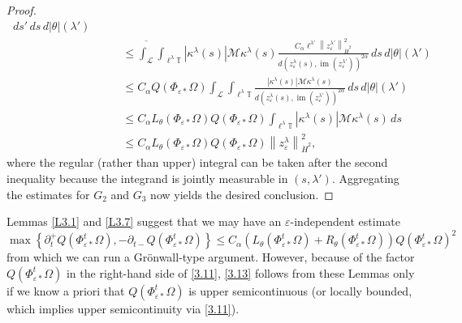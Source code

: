 \documentclass[reqno,centertags,12pt]{amsart}
\theoremstyle{definition}
\numberwithin{equation}{section}
\newcommand{\abs}[1]{\left\lvert#1\right\rvert}
\newcommand{\norm}[1]{\left\|#1\right\|}
\newcommand{\set}[1]{\left\{ #1 \right\}}
\newcommand{\bbT}{{\mathbb{T}}}
\newcommand{\eps}{\varepsilon}
\newcommand{\tht}{\theta}
\begin{document}
\begin{proof}
\begin{align*}
        \,ds'\,ds\,d|\theta|(\lambda')
        \\&\quad\quad \leq
        \overline{\int_{\mathcal{L}}}
        \int_{\ell^{\lambda}\bbT}\abs{\kappa^{\lambda}(s)}\mathcal{M}\kappa^{\lambda}(s)
        \frac{C_{\alpha}\ell^{\lambda'}\norm{z_{\eps}^{\lambda'}}_{\dot{H}^{2}}^{2}}
        {d(z_{\eps}^{\lambda}(s), \operatorname{im}(z_{\eps}^{\lambda'}))^{2\alpha}}
        \,ds\,d|\theta|(\lambda')
        \\&\quad\quad \leq
        C_{\alpha}Q(\Phi_{\eps*}\Omega)
        \int_{\mathcal{L}}
        \int_{\ell^{\lambda}\bbT}
        \frac{\abs{\kappa^{\lambda}(s)}\mathcal{M}\kappa^{\lambda}(s)}
        {d(z_{\eps}^{\lambda}(s), \operatorname{im}(z_{\eps}^{\lambda'}))^{2\alpha}}
        \,ds\,d|\theta|(\lambda')
        \\&\quad\quad \leq
        C_{\alpha}L_{\tht}(\Phi_{\eps*}\Omega)Q(\Phi_{\eps*}\Omega)
        \int_{\ell^{\lambda}\bbT}
        \abs{\kappa^{\lambda}(s)}\mathcal{M}\kappa^{\lambda}(s)\,ds
        \\&\quad\quad \leq C_{\alpha}L_{\tht}(\Phi_{\eps*}\Omega)Q(\Phi_{\eps*}\Omega)
        \norm{z_{\eps}^{\lambda}}_{\dot{H}^{2}}^{2},
    \end{align*}
    where  the regular (rather than upper) integral can be taken after the second inequality  because
    the integrand is jointly measurable in $(s,\lambda')$.
    Aggregating the estimates for $G_{2}$ and $G_{3}$ now yields the desired conclusion.
\end{proof}

Lemmas \ref{L3.1} and \ref{L3.7} suggest that we may have an $\eps$-independent estimate
\begin{equation}\label{3.13}
    \max\set{\partial_{t}^{+}Q(\Phi_{\eps*}^{t}\Omega),
    -\partial_{t-}Q(\Phi_{\eps*}^{t}\Omega)}
    \leq C_{\alpha}(L_{\tht}(\Phi_{\eps*}^{t}\Omega) + R_{\tht}(\Phi_{\eps*}^{t}\Omega))
    Q(\Phi_{\eps*}^{t}\Omega)^{2}
\end{equation}
from which we can run a Gr\"{o}nwall-type argument. However,
because of the factor $Q(\Phi_{\eps*}^{t}\Omega)$ in the right-hand side of \eqref{3.11},
\eqref{3.13} follows from these Lemmas only if we know a priori that
$Q(\Phi_{\eps*}^{t}\Omega)$ is upper semicontinuous (or locally bounded,
which implies upper semicontinuity via \eqref{3.11}).
\end{document}
